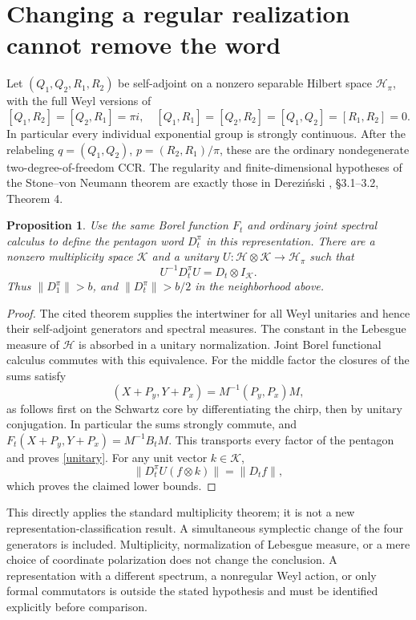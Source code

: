 \documentclass[11pt,a4paper]{article}
\newcommand{\HH}{\mathcal H}
\newtheorem{proposition}{Proposition}
\begin{document}
\newpage
\section{Changing a regular realization cannot remove the word}
Let $(Q_1,Q_2,R_1,R_2)$ be self-adjoint on a nonzero separable Hilbert
space $\HH_\pi$, with the full Weyl versions of
\[
 [Q_1,R_2]=[Q_2,R_1]=\pi i,
 \quad[Q_1,R_1]=[Q_2,R_2]=[Q_1,Q_2]=[R_1,R_2]=0.
\]
In particular every individual exponential group is strongly continuous.
After the relabeling $q=(Q_1,Q_2)$, $p=(R_2,R_1)/\pi$, these are the
ordinary nondegenerate two-degree-of-freedom CCR. The regularity and
finite-dimensional hypotheses of the Stone--von Neumann theorem are
exactly those in Derezi\'nski \cite{derezinski}, \S3.1--3.2, Theorem 4.

\begin{proposition}
Use the same Borel function $F_t$ and ordinary joint spectral calculus
to define the pentagon word $D_t^\pi$ in this representation. There are
a nonzero multiplicity space $\mathcal K$ and a unitary
$U:\HH\otimes\mathcal K\to\HH_\pi$ such that
\begin{equation}
 U^{-1}D_t^\pi U=D_t\otimes I_{\mathcal K}.\label{unitary}
\end{equation}
Thus $\|D_1^\pi\|>b$, and $\|D_t^\pi\|>b/2$ in the neighborhood above.
\end{proposition}
\begin{proof}
The cited theorem supplies the intertwiner for all Weyl unitaries and
hence their self-adjoint generators and spectral measures. The constant
in the Lebesgue measure of $\HH$ is absorbed in a unitary normalization.
Joint Borel functional calculus commutes with this equivalence.
For the middle factor the closures of the sums satisfy
\[
 (X+P_y,Y+P_x)=M^{-1}(P_y,P_x)M,
\]
as follows first on the Schwartz core by differentiating the chirp,
then by unitary conjugation. In particular the sums strongly commute,
and $F_t(X+P_y,Y+P_x)=M^{-1}B_tM$. This transports every factor of the
pentagon and proves \eqref{unitary}. For any unit vector $k\in\mathcal K$,
\[
 \|D_t^\pi U(f\otimes k)\|=\|D_tf\|,
\]
which proves the claimed lower bounds.
\end{proof}
This directly applies the standard multiplicity theorem; it is not a
new representation-classification result. A simultaneous symplectic
change of the four generators is included. Multiplicity, normalization
of Lebesgue measure, or a mere choice of coordinate polarization does
not change the conclusion. A representation with a different spectrum,
a nonregular Weyl action, or only formal commutators is outside the
stated hypothesis and must be identified explicitly before comparison.
\end{document}
